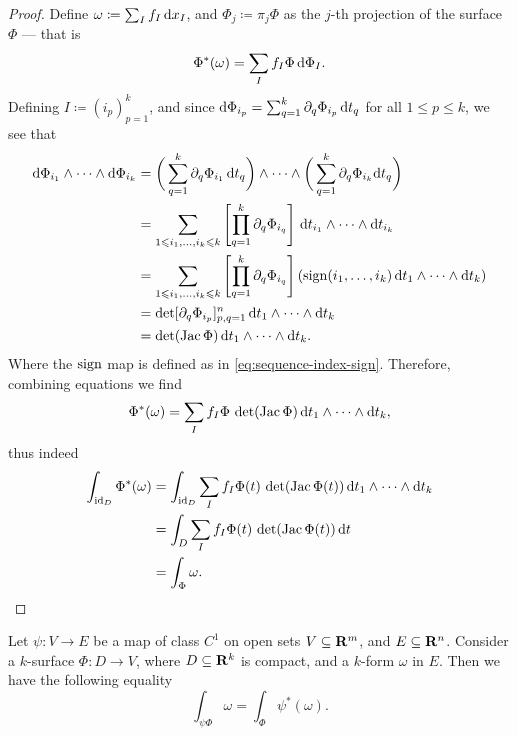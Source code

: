 \begin{proof}
Define \(\omega \coloneq \sum_I f_I\, \mathrm{d} x_I\), and \(\Phi_j \coloneq \pi_j
\Phi\) as the \(j\)-th projection of the surface \(\Phi\) --- that is
\[
  \Phi^{*}(\omega) = \sum_I f_I \Phi\, \mathrm{d} \Phi_I.
\]
Defining \(I \coloneq (i_p)_{p=1}^k\), and since \(\mathrm{d} \Phi_{i_p} =
\sum_{q=1}^k \partial_q \Phi_{i_p}\, \mathrm{d} t_{q}\) for all \(1 \leq p \leq k\),
we see that
\begin{align*}
  \mathrm{d} \Phi_{i_1} \wedge \dots \wedge \mathrm{d} \Phi_{i_k}
  &= \bigg( \sum_{q=1}^k \partial_q \Phi_{i_1}\, \mathrm{d} t_{q} \bigg)
    \wedge \dots \wedge \bigg( \sum_{q=1}^k \partial_q \Phi_{i_k} \mathrm{d} t_q \bigg)
  \\
  &= \sum_{1 \leqslant i_1, \dots, i_k \leqslant k} \left[
    \prod_{q=1}^k \partial_q \Phi_{i_q}
  \right]\, \mathrm{d} t_{i_1} \wedge \dots \wedge \mathrm{d} t_{i_k} \\
  &= \sum_{1 \leqslant i_1, \dots, i_k \leqslant k} \left[
    \prod_{q=1}^k \partial_q \Phi_{i_q}
  \right] \left(
    \operatorname{sign}(i_1, \dots, i_k)\, \mathrm{d} t_{1} \wedge \dots \wedge \mathrm{d} t_{k}
  \right) \\
  &= \det [\partial_q \Phi_{i_p}]_{p, q = 1}^{n}\,
    \mathrm{d} t_1 \wedge \dots \wedge \mathrm{d} t_k \\
  &= \det(\operatorname{Jac} \Phi)\, \mathrm{d} t_1 \wedge \dots \wedge \mathrm{d} t_k.
\end{align*}
Where the \(\operatorname{sign}\) map is defined as in
\cref{eq:sequence-index-sign}. Therefore, combining equations we find
\[
  \Phi^{*}(\omega) = \sum_I f_I \Phi\, \det(\operatorname{Jac} \Phi)\,
  \mathrm{d} t_1 \wedge \dots \wedge \mathrm{d} t_k,
\]
thus indeed
\begin{align*}
  \int_{\operatorname{id}_D} \Phi^{*}(\omega)
  &= \int_{\operatorname{id}_D} \sum_I
    f_I \Phi(t)\, \det(\operatorname{Jac} \Phi(t))\, \mathrm{d} t_1 \wedge \dots \wedge \mathrm{d} t_k
  \\
  &= \int_D \sum_I f_I \Phi(t)\, \det(\operatorname{Jac} \Phi(t))\, \mathrm{d} t \\
  &= \int_{\Phi} \omega.
\end{align*}
\end{proof}

\begin{theorem}
\label{thm:change-of-variable-integral-over-surface-forms}
Let \(\psi: V \to E\) be a map of class \(C^1\) on open sets \(V \subseteq
\mathbf{R}^m\), and \(E \subseteq \mathbf{R}^n\). Consider a \(k\)-surface \(\Phi: D \to V\),
where \(D \subseteq \mathbf{R}^k\) is compact, and a \(k\)-form \(\omega\) in
\(E\). Then we have the following equality
\[
  \int_{\psi \Phi} \omega = \int_{\Phi} \psi^{*}(\omega).
\]
\end{theorem}

